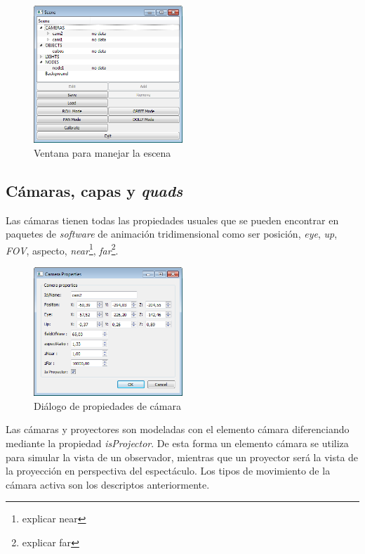 \begin{figure}[H]
  \centering
    \includegraphics[width=0.5\textwidth]{./Cap5_vmt/vmt_scene.png}
  \caption{Ventana para manejar la escena}
  \label{fig:VMT-SceneWindow}
\end{figure}

\subsection{Cámaras, capas y \emph{quads}}
Las cámaras tienen todas las propiedades usuales que se pueden encontrar en paquetes de \emph{software} de animación tridimensional como ser posición, \emph{eye}, \emph{up}, \emph{FOV}, aspecto, \emph{near}\footnote{explicar near}, \emph{far}\footnote{explicar far}.

\begin{figure}[H]
  \centering
    \includegraphics[width=0.5\textwidth]{./Cap5_vmt/vmt_cameraProperties.png}
  \caption{Diálogo de propiedades de cámara}
  \label{fig:VMT-CameraProperties}
\end{figure}

Las cámaras y proyectores son modeladas con el elemento cámara diferenciando mediante la propiedad \emph{isProjector}. De esta forma un elemento cámara se utiliza para simular la vista de un observador, mientras que un proyector será la vista de la proyección en perspectiva del espectáculo.
Los tipos de movimiento de la cámara activa son los descriptos anteriormente.

